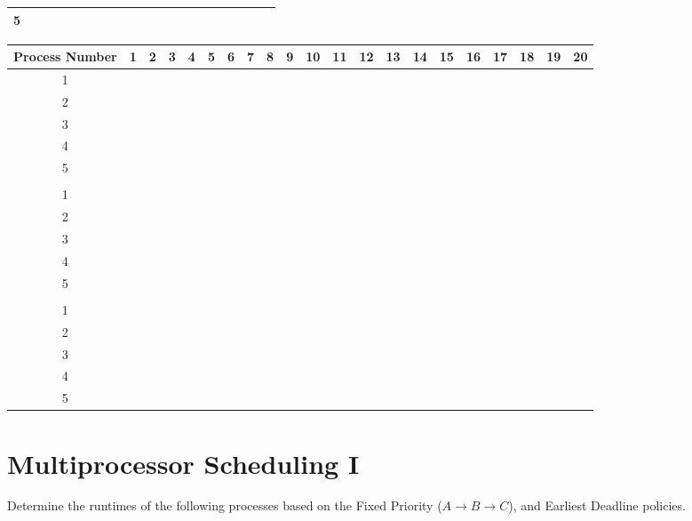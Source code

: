 \documentclass{article}
\newcommand{\generateHeader}{
\hline
Process Number & 1 & 2 & 3 & 4 & 5 & 6 & 7 & 8 & 9 & 10 & 11 & 12 & 13 & 14 & 15 & 16 & 17 & 18 & 19 & 20\\
\hline
}
\newcommand{\bc}{\cellcolor{blue!60}}
\newcommand{\blackc}{\cellcolor{black!}}
\newcommand{\blackrow}{
\blackc & \blackc & \blackc & \blackc & \blackc & \blackc & \blackc & \blackc & \blackc & \blackc & \blackc & \blackc & \blackc & \blackc & \blackc & \blackc & \blackc & \blackc & \blackc & \blackc & \blackc\\
\hline
}
\begin{document}
\begin{center}
\begin{tabular}{|c|c|c|c|c|c|c|c|c|c|c|c|c|c|c|c|c|c|c|c|c|}
\hline
5	&	&	&	&	&	&	&	&	&	&	&	&	&	&	&	&\bc	&\bc	&\bc	&\bc	&\bc\\
\hline
\end{tabular}
\newpage
\begin{tabular}{|c|c|c|c|c|c|c|c|c|c|c|c|c|c|c|c|c|c|c|c|c|}
\generateHeader
1	&\bc&\bc&\bc&	&	&	&	&	&	&	&	&	&	&	&	&	&	&	&	&\\
\hline
2	&	&	&	&\bc&\bc&\bc&\bc&\bc&	&	&	&	&	&	&	&	&	&	&	&\\
\hline
3	&	&	&	&	&	&	&	&	&\bc&\bc&	&	&	&	&	&	&	&	&	&\\
\hline
4	&	&	&	&	&	&	&	&	&	&	&\bc&\bc&\bc&\bc&\bc&	&	&	&	&\\
\hline
5	&	&	&	&	&	&	&	&	&	&	&	&	&	&	&	&\bc&\bc&\bc&\bc&\bc\\
\hline
\blackrow
1	&\bc	&	&\bc	&	&	&	&\bc	&	&	&	&	&	&	&	&	&	&	&	&	&\\
\hline
2	&	&\bc	&	&	&\bc	&	&	&\bc	&\bc	&	&	&	&	&	&	&	&	&\bc	&	&\\
\hline
3	&	&	&	&\bc	&	&\bc	&	&	&	&	&	&	&	&	&	&	&	&	&	&\\
\hline
4	&	&	&	&	&	&	&	&	&	&\bc	&\bc	&\bc	&	&	&	&\bc	&	&	&\bc	&\\
\hline
5	&	&	&	&	&	&	&	&	&	&	&	&	&\bc	&\bc	&\bc	&	&\bc	&	&	&\bc\\
\hline
\blackrow
1	&\bc	&	&\bc	&\bc	&	&	&	&	&	&	&	&	&	&	&	&	&	&	&	&\\
\hline
2	&	&\bc	&	&	&	&\bc	&\bc	&	&\bc	&\bc	&	&	&	&	&	&	&	&	&	&\\
\hline
3	&	&	&	&	&\bc	&	&	&\bc	&	&	&	&	&	&	&	&	&	&	&	&\\
\hline
4	&	&	&	&	&	&	&	&	&	&	&\bc	&\bc	&\bc	&	&\bc	&\bc	&	&	&	&\\
\hline
5	&	&	&	&	&	&	&	&	&	&	&	&	&	&\bc	&	&	&\bc	&\bc	&\bc	&\bc\\
\hline
\end{tabular}
\end{center}
\newpage


\section{Multiprocessor Scheduling I}
Determine the runtimes of the following processes based on the Fixed Priority
($A\to B \to C$), and Earliest Deadline policies.
\end{document}
